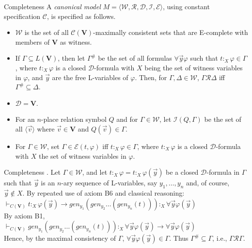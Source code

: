 \documentclass{beamer}
\theoremstyle{definition}
\newcommand{\C}{\mathcal{C}}
\newcommand{\D}{\mathcal{D}}
\newcommand{\W}{\mathcal{W}}
\newcommand{\R}{\mathcal{R}}
\newcommand{\E}{\mathcal{E}}
\newcommand{\I}{\mathcal{I}}
\newcommand{\Fmodel}{\bl\W,\R,\D,\I,\E \br}
\newcommand{\impli}{\rightarrow}
\newcommand{\todo}{\forall}
\newcommand{\teo}{\vdash}
\newcommand{\bl}{\langle}
\newcommand{\br}{\rangle}
\begin{document}
\begin{frame}{Completeness}
\qquad A \textit{canonical model} $M = \Fmodel$, using constant specification $\C$, is specified as follows.
	
\begin{itemize}
		\item $\W$ is the set of all $\C(\textbf{V})$-maximally consistent sets that are E-complete with members of \textbf{V} as witness.
		\item If $\Gamma \subseteq L(\textbf{V})$, then let $\Gamma^{\#}$ be the set of all formulas $\todo \vec{y} \varphi$ such that $t$$:_{X}$$\varphi \in \Gamma$, where $t$$:_{X}$$\varphi$ is a closed $\D$-formula with $X$ being the set of witness variables in $\varphi$, and $\vec{y}$ are the free L-variables of $\varphi$. Then, for $\Gamma, \Delta \in \W$, $\Gamma\R\Delta$ iff $\Gamma^{\#} \subseteq  \Delta$.
		\item $\D = \textbf{V}$.
		\item For an $n$-place relation symbol $Q$ and for $\Gamma \in \W$, let $\I(Q,\Gamma)$ be the set of all $\bl \vec{v}\br$ where $\vec{v} \in \textbf{V}$ and $Q(\vec{v}) \in \Gamma$.
		\item For $\Gamma \in \W$, set $\Gamma \in \E(t,\varphi)$ iff $t$$:_{X}$$\varphi \in \Gamma$, where $t$$:_{X}$$\varphi$ is a closed $\D$-formula with $X$ the set of witness variables in $\varphi$.
\end{itemize}
\end{frame}	



\begin{frame}{Completeness}
\qquad {\color{blue}$\R$ is reflexive}. Let $\Gamma \in \W$, and let $t$$:_{X}$$\varphi = t$$:_{X}$$\varphi(\vec{y})$ be a closed $\D$-formula in $\Gamma$ such that $\vec{y}$ is an $n$-ary sequence of L-variables, say $y_{1}, \dots, y_{n}$ and, of course, $\vec{y} \notin X$. By repeated use of axiom B6 and classical reasoning:\\
\vspace{5mm}
$\teo_{C(\textbf{V})}t$$:_{X}$$\varphi(\vec{y}) \impli gen_{y_{1}}(gen_{y_{2}} \dots (gen_{y_{n}}(t)))$$:_{X}\todo \vec{y} \varphi(\vec{y})$\\
\vspace{5mm}
By axiom B1,\\
\vspace{5mm}
$\teo_{C(\textbf{V})} gen_{y_{1}}(gen_{y_{2}} \dots (gen_{y_{n}}(t)))$$:_{X}\todo \vec{y} \varphi(\vec{y}) \impli \todo \vec{y} \varphi(\vec{y})$\\
\vspace{5mm}
Hence, by the maximal consistency of $\Gamma$, $\todo \vec{y} \varphi(\vec{y}) \in \Gamma$. Thus $\Gamma^{\#} \subseteq \Gamma$, i.e., $\Gamma\R\Gamma$.
\end{frame}
\end{document}
